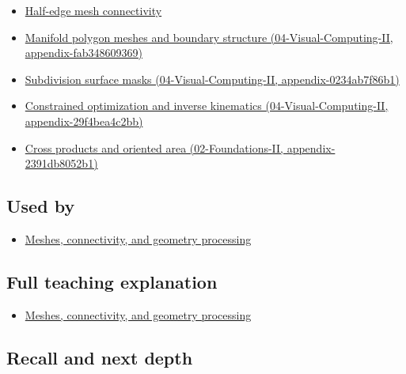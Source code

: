 \begin{itemize}
\tightlist
\item
  \hyperref[appendix-1aea26b2307f]{Half-edge mesh connectivity}
\item
  \href{../04-Visual-Computing-II/main.pdf\#nameddest=appendix-fab348609369}{Manifold polygon meshes and boundary structure (04-Visual-Computing-II, appendix-fab348609369)}
\item
  \href{../04-Visual-Computing-II/main.pdf\#nameddest=appendix-0234ab7f86b1}{Subdivision surface masks (04-Visual-Computing-II, appendix-0234ab7f86b1)}
\item
  \href{../04-Visual-Computing-II/main.pdf\#nameddest=appendix-29f4bea4c2bb}{Constrained optimization and inverse kinematics (04-Visual-Computing-II, appendix-29f4bea4c2bb)}
\item
  \href{../02-Foundations-II/main.pdf\#nameddest=appendix-2391db8052b1}{Cross products and oriented area (02-Foundations-II, appendix-2391db8052b1)}
\end{itemize}

\subsection{Used by}\label{appendix-7107009c505b-used-by}

\begin{itemize}
\tightlist
\item
  \hyperref[03-visual-computing-i-ch002-meshes-connectivity-and-geometry-processing]{Meshes, connectivity, and geometry processing}
\end{itemize}

\subsection{Full teaching explanation}\label{appendix-7107009c505b-full-teaching-explanation}

\begin{itemize}
\tightlist
\item
  \hyperref[03-visual-computing-i-ch002-meshes-connectivity-and-geometry-processing]{Meshes, connectivity, and geometry processing}
\end{itemize}

\subsection{Recall and next depth}\label{appendix-7107009c505b-recall-and-next-depth}

